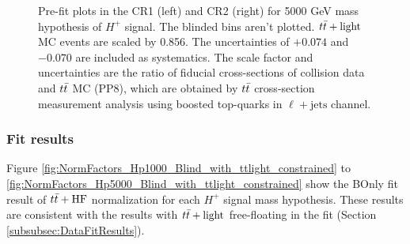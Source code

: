 \begin{figure}[H]
  \centering
  \caption{Pre-fit plots in the CR1 (left) and CR2 (right) for 5000 GeV mass hypothesis of $H^{+}$ signal. The blinded bins aren't plotted. $t\Bar{t}+\text{light}$ MC events are scaled by 0.856. The uncertainties of $+0.074$ and $-0.070$ are included as systematics. The scale factor and uncertainties are the ratio of fiducial cross-sections of collision data and $t\Bar{t}$ MC (PP8), which are obtained by $t\Bar{t}$ cross-section measurement analysis using boosted top-quarks in $\ell+\text{jets}$ channel.}
  \label{fig:Prefit_Hp5000_Blind_with_ttlight_constrained}
\end{figure}


\subsubsection{Fit results}
Figure \ref{fig:NormFactors_Hp1000_Blind_with_ttlight_constrained} to \ref{fig:NormFactors_Hp5000_Blind_with_ttlight_constrained} show the BOnly fit result of $t\Bar{t}+\text{HF}$ normalization for each $H^{+}$ signal mass hypothesis. These results are consistent with the results with $t\Bar{t}+\text{light}$ free-floating in the fit (Section \ref{subsubsec:DataFitResults}).

